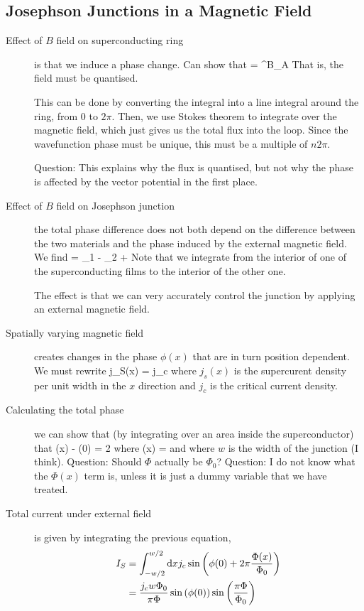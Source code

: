 \subsection{Josephson Junctions in a Magnetic Field}
\begin{description}
\item[Effect of $B$ field on superconducting ring ] is that we induce a phase change. Can show that 
\beq
\Delta \phi =  \int^B_A  \cdot \intd {}
\eeq
That is, the field must be quantised. 

This can be done by converting the integral into a line integral around the ring, from 0 to $2\pi$. Then, we use Stokes theorem to integrate over the magnetic field, which just gives us the total flux into the loop. Since the wavefunction phase must be unique, this must be a multiple of $n 2\pi$. 

Question: This explains why the flux is quantised, but not why the phase is affected by the vector potential in the first place. 

\item[Effect of $B$ field on Josephson junction] the total phase difference does not both depend on the difference between the two materials and the phase induced by the external magnetic field. We find
\beq
\phi = \phi_1 - \phi_2 +  \int {} \cdot \intd {}
\eeq
Note that we integrate from the interior of one of the superconducting films to the interior of the other one. 

The effect is that we can very accurately control the junction by applying an external magnetic field. 

\item[Spatially varying magnetic field] creates changes in the phase $\phi(x)$ that are in turn position dependent. We must rewrite
\beq
j_S(x) = j_c 
\eeq
where $j_s(x)$ is the supercurent density per unit width in the $x$ direction and $j_c$ is the  critical current density. 

\item[Calculating the total phase] we can show that (by integrating over an area inside the superconductor) that
\beq
\phi(x) - \phi(0) = 2\pi {}
\eeq
where
\beq
\Phi(x) = 
\eeq
and where $w$ is the width of the junction (I think). 
Question: Should $\Phi$ actually be $\Phi_0$? 
Question: I do not know what the $\Phi(x)$ term is, unless it is just a dummy variable that we have treated. 

\item[Total current under external field] is given by integrating the previous equation, 
\begin{align}
I_S &= \int^{w/2}_{- w/2} \mathrm{d} x j_c \sin{\left( \phi(0) + 2 \pi \frac{\Phi(x)}{\Phi_0} \right)} \\
&= \frac{j_c w \Phi_0}{\pi \Phi} \sin{\left( \phi(0)\right)} \sin{\left( \frac{\pi \Phi}{\Phi_0} \right) }
\end{align}


\end{description}
